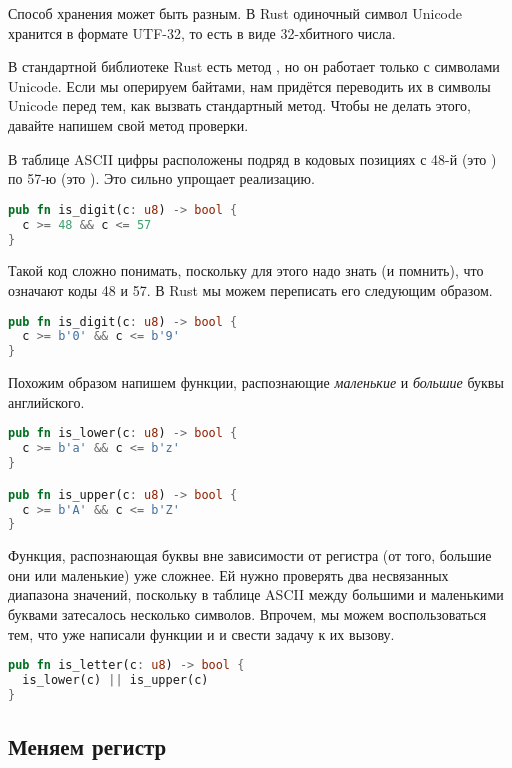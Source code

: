 Способ хранения может быть разным.
В Rust одиночный символ Unicode хранится в формате UTF-32, то есть в виде 32-хбитного числа.

В стандартной библиотеке Rust есть метод , но он работает только с символами Unicode.
Если мы оперируем байтами, нам придётся переводить их в символы Unicode перед тем, как вызвать стандартный метод.
Чтобы не делать этого, давайте напишем свой метод проверки.

В таблице ASCII цифры расположены подряд в кодовых позициях с 48-й (это ) по 57-ю (это ).
Это сильно упрощает реализацию.

\begin{lstlisting}[language=Rust]
pub fn is_digit(c: u8) -> bool {
  c >= 48 && c <= 57
}
\end{lstlisting}

Такой код сложно понимать, поскольку для этого надо знать (и помнить), что означают коды 48 и 57.
В Rust мы можем переписать его следующим образом.

\begin{lstlisting}[language=Rust]
pub fn is_digit(c: u8) -> bool {
  c >= b'0' && c <= b'9'
}
\end{lstlisting}

Похожим образом напишем функции, распознающие {\em маленькие} и {\em большие} буквы английского.

\begin{lstlisting}[language=Rust]
pub fn is_lower(c: u8) -> bool {
  c >= b'a' && c <= b'z'
}

pub fn is_upper(c: u8) -> bool {
  c >= b'A' && c <= b'Z'
}
\end{lstlisting}

Функция, распознающая буквы вне зависимости от регистра (от того, большие они или маленькие) уже сложнее.
Ей нужно проверять два несвязанных диапазона значений, поскольку в таблице ASCII между большими и маленькими буквами затесалось несколько символов.
Впрочем, мы можем воспользоваться тем, что уже написали функции  и  и свести задачу к их вызову.

\begin{lstlisting}[language=Rust]
pub fn is_letter(c: u8) -> bool {
  is_lower(c) || is_upper(c)
}
\end{lstlisting}

\subsection{Меняем регистр}

